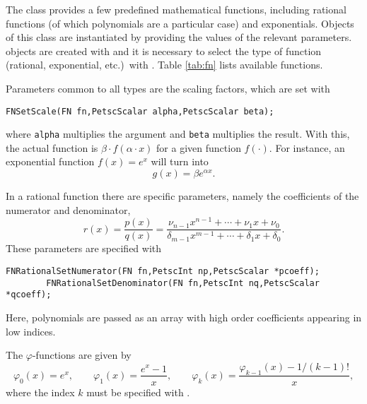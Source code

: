 The  class provides a few predefined mathematical functions, including rational functions (of which polynomials are a particular case) and exponentials. Objects of this class are instantiated by providing the values of the relevant parameters.  objects are created with  and it is necessary to select the type of function (rational, exponential, etc.)\ with . Table \ref{tab:fn} lists available functions.

Parameters common to all  types are the scaling factors, which are set with
        \begin{Verbatim}[fontsize=\small]
        FNSetScale(FN fn,PetscScalar alpha,PetscScalar beta);
        \end{Verbatim}
where \texttt{alpha} multiplies the argument and \texttt{beta} multiplies the result. With this, the actual function is $\beta\cdot f(\alpha\cdot x)$ for a given function $f(\cdot)$. For instance, an exponential function $f(x)=e^x$ will turn into
\begin{equation}
g(x)=\beta e^{\alpha x}.
\end{equation}

In a rational function there are specific parameters, namely the coefficients of the numerator and denominator,
\begin{equation}
r(x)=\frac{p(x)}{q(x)}
=\frac{\nu_{n-1}x^{n-1}+\cdots+\nu_1x+\nu_0}{\delta_{m-1}x^{m-1}+\cdots+\delta_1x+\delta_0}.
\end{equation}
These parameters are specified with
        \begin{Verbatim}[fontsize=\small]
        FNRationalSetNumerator(FN fn,PetscInt np,PetscScalar *pcoeff);
        FNRationalSetDenominator(FN fn,PetscInt nq,PetscScalar *qcoeff);
        \end{Verbatim}
Here, polynomials are passed as an array with high order coefficients appearing in low indices.

The $\varphi$-functions are given by
\begin{equation}
\varphi_0(x)=e^x,\qquad \varphi_1(x)=\frac{e^x-1}{x},\qquad \varphi_k(x)=\frac{\varphi_{k-1}(x)-1/(k-1)!}{x},
\end{equation}
where the index $k$ must be specified with .

